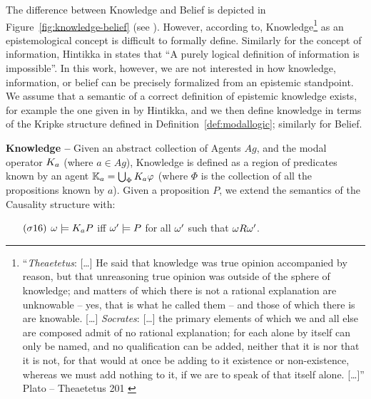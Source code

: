 The difference between Knowledge and Belief is depicted in
Figure~\ref{fig:knowledge-belief} (see \autocite{wiki-knowledgebelief}).  However,
according to\autocite{Gettier2012knowledge},
Knowledge\footnote{``\emph{Theaetetus}: [\ldots] He said that knowledge was
true opinion accompanied by reason, but that unreasoning true opinion was
outside of the sphere of knowledge; and matters of which there is not a
rational explanation are unknowable -- yes, that is what he called them -- and
those of which there is are knowable. [\ldots] \emph{Socrates}: [\ldots] the
primary elements of which we and all else are composed admit of no rational
explanation; for each alone by itself can only be named, and no qualification
can be added, neither that it is nor that it is not, for that would at once be
adding to it existence or non-existence, whereas we must add nothing to it, if
we are to speak of that itself alone.  [\ldots]'' Plato -- Theaetetus 201
\autocite{Plato1914Plato}} as an epistemological concept is difficult to formally define. 
Similarly for the concept of information, Hintikka in \autocite{Hintikka1993Information}
states that ``A purely logical definition of information is impossible''.
In this work, however, we are not interested in how knowledge, information, or
belief can be precisely formalized from an epistemic standpoint.  We assume
that a semantic of a correct definition of epistemic knowledge exists, for
example the one given in\autocite{Hintikka1962knowledge} by Hintikka, and we
then define knowledge in terms of the Kripke structure defined in
Definition~\ref{def:modallogic}; similarly for Belief.

\begin{definition}{\bf Knowledge --}\label{def:knowledge}
Given an abstract collection of Agents $Ag$, and the modal operator
	$K_{a}$ (where $a\in Ag$), Knowledge is defined as a region 
	of predicates known by an agent $\mathbb{K}_{a}=\bigcup_\Phi K_{a}\varphi$ 
	(where $\Phi$ is the collection of all the propositions known by $a$).
	Given a proposition $P$, we extend the semantics of the Causality structure with:
	\begin{enumerate}[noitemsep]
		\item[$(\sigma16)$] $\omega\models K_{a}P$ iff
			$\omega'\models P$ for all $\omega'$ such that
			$\omega R\omega'$.
	\end{enumerate}
\end{definition}

